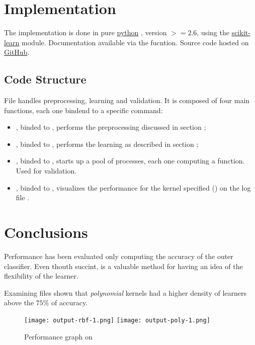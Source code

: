 \documentclass[10pt]{article}
\begin{document}
\section{Implementation}
The implementation is done in pure 
\href{https://python.org/}{python}
, version $>=2.6$, using the \href{http://scikit-learn.org/stable/}{scikit-learn}
module. Documentation available via the  fucntion. 
Source code hosted on \href{https://github.com/mmaker/braindecoding}{GitHub}.

\subsection{Code Structure}
File  handles preprocessing, learning and validation. It is composed of four main functions, each one bindend to a specific command: 
\begin{itemize}
\item {}, binded to , performs the preprocessing discussed in section ;
\item {}, binded to , performs the learning as described in section ;
\item {}, binded to , starts up a pool of processes, each one computing a  function. Used for validation.
\item {}, binded to , visualizes the performance for the kernel specified () on the log file .
\end{itemize}

\section{Conclusions}
Performance has been evaluated only computing the accuracy of the outer classifier. Even thouth succint, is a valuable method for having an idea of the flexibility of the learner.

Examining files  shown that \emph{polynomial} kernels had a higher density of learners above the $75\%$ of accuracy.

\begin{figure}[H]
\texttt{[image: output-rbf-1.png]}
\hfill
\texttt{[image: output-poly-1.png]}
\hfill
\caption{Performance graph on }
\end{figure}
\end{document}
